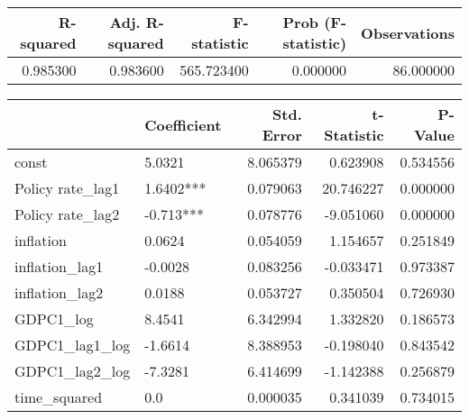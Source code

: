 \begin{tabular}{rrrrr}
\toprule
\textbf{R-squared} & \textbf{Adj. R-squared} & \textbf{F-statistic} & \textbf{Prob (F-statistic)} & \textbf{Observations} \\
\midrule
0.985300 & 0.983600 & 565.723400 & 0.000000 & 86.000000 \\
\bottomrule
\end{tabular}

\begin{tabular}{llrrr}
\toprule
 & \textbf{Coefficient} & \textbf{Std. Error} & \textbf{t-Statistic} & \textbf{P-Value} \\
\midrule
const & 5.0321 & 8.065379 & 0.623908 & 0.534556 \\
Policy rate_lag1 & 1.6402*** & 0.079063 & 20.746227 & 0.000000 \\
Policy rate_lag2 & -0.713*** & 0.078776 & -9.051060 & 0.000000 \\
inflation & 0.0624 & 0.054059 & 1.154657 & 0.251849 \\
inflation_lag1 & -0.0028 & 0.083256 & -0.033471 & 0.973387 \\
inflation_lag2 & 0.0188 & 0.053727 & 0.350504 & 0.726930 \\
GDPC1_log & 8.4541 & 6.342994 & 1.332820 & 0.186573 \\
GDPC1_lag1_log & -1.6614 & 8.388953 & -0.198040 & 0.843542 \\
GDPC1_lag2_log & -7.3281 & 6.414699 & -1.142388 & 0.256879 \\
time_squared & 0.0 & 0.000035 & 0.341039 & 0.734015 \\
\bottomrule
\end{tabular}
